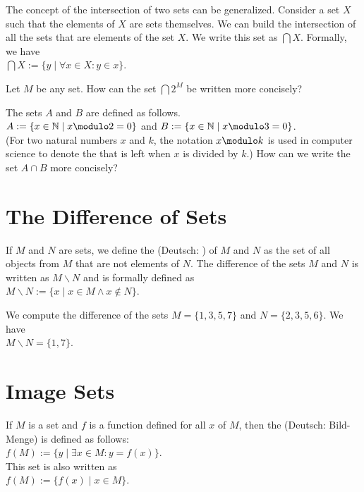 The concept of the intersection of two sets can be generalized.  Consider
a set $X$ such that the elements of $X$ are sets themselves. 
We can build the intersection of all the 
sets that are elements of the set $X$.  We write this set as $\bigcap X$.  Formally,
we have
\\[0.2cm]
\hspace*{1.3cm} 
$\bigcap X := \{ y \;|\; \forall x \in X: y \in x \}$.
\vspace*{0.2cm}

\exerciseEng
Let $M$ be any set.  How can the set $\bigcap 2^M$ be written more concisely?
\eox

\exerciseEng
The sets $A$ and $B$ are defined as follows. 
\\[0.2cm]
\hspace*{1.3cm}
$A := \{ x \in \mathbb{N} \mid x \modulo 2 = 0 \}$ \quad and \quad
$B := \{ x \in \mathbb{N} \mid x \modulo 3 = 0 \}$.
\\[0.2cm]
(For two natural numbers $x$ and $k$, the notation $x \modulo k$ is used in computer science to denote the
 that is left when $x$ is divided by $k$.)
How can we write the set $A \cap B$ more concisely?
\eox


\section{The Difference of Sets}
If $M$ and $N$ are sets, we define the   
(Deutsch: ) 
of $M$ and $N$ as the set of all objects from $M$ that are not elements of $N$.  The difference of the sets $M$
and $N$ is written as $M\backslash N$ and is formally defined as
 \\[0.2cm]
\hspace*{1.3cm} $M \backslash N := \{ x \mid x \in M \wedge x \not\in N \}$.

\exampleEng
We compute the difference of the sets $M = \{ 1, 3, 5, 7 \}$ and $N = \{ 2, 3, 5, 6 \}$.  We have
\\[0.2cm]
\hspace*{1.3cm} $M \backslash N = \{ 1, 7 \}$. \eox

\section{Image Sets}
If $M$ is a set and $f$ is a function defined for all $x$ of $M$, then the 
(Deutsch: Bild-Menge) 
is defined as follows:
\\[0.2cm]
\hspace*{1.3cm}
$f(M) := \{ y \;|\; \exists x \in M: y = f(x) \}$. 
\\[0.2cm]
This set is also written as
\\[0.2cm]
\hspace*{1.3cm}
$f(M) := \bigl\{ f(x) \;|\; x \in M \}$. 

